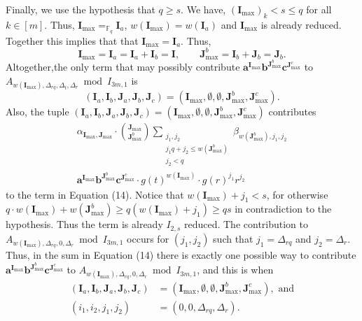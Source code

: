 Finally, we use the hypothesis that $q\geq s$. We have, $(\boldsymbol I_{\max})_k<s\leq q$ for all $k\in[m]$. Thus, $\boldsymbol I_{\max}=_{\mathbb F_q}\boldsymbol I_a$, $w(\boldsymbol I_{\max})=w(\boldsymbol I_a)$ and $\boldsymbol I_{\max}$ is already reduced. Together this implies that that $\boldsymbol I_{\max}=\boldsymbol I_a$.
Thus,
\[\boldsymbol I_{\max}=\boldsymbol I_a=\boldsymbol I_a+\boldsymbol I_b=\boldsymbol I,\qquad\boldsymbol J_{\max}^b=\boldsymbol I_b+\boldsymbol J_b=\boldsymbol J_b.\]
Altogether,the only term that may possibly contribute $\boldsymbol a^{\boldsymbol I_{\max}}\boldsymbol b^{\boldsymbol J_{\max}^b}\boldsymbol c^{\boldsymbol J_{\max}^c}$ to $A_{w(\boldsymbol I_{\max}),\Delta_{rq},\Delta_t,\Delta_r}\bmod I_{3m,1}$ is
\[(\boldsymbol I_a,\boldsymbol I_b,\boldsymbol J_a,\boldsymbol J_b,\boldsymbol J_c)=(\boldsymbol I_{\max},\emptyset,\emptyset,\boldsymbol J_{\max}^b,\boldsymbol J_{\max}^c).\]
Also, the tuple $(\boldsymbol I_a,\boldsymbol I_b,\boldsymbol J_a,\boldsymbol J_b,\boldsymbol J_c)=(\boldsymbol I_{\max},\emptyset,\emptyset,\boldsymbol J_{\max}^b,\boldsymbol J_{\max}^c)$ contributes
\begin{multline*}
\alpha_{\boldsymbol I_{\max},\boldsymbol J_{\max}}\cdot\binom{\boldsymbol J_{\max}}{\boldsymbol J_{\max}^b}\sum_{\substack{j_1,j_2\\j_1q+j_2\leq w(\boldsymbol J_{\max}^b)\\j_2<q}}\beta_{w(\boldsymbol J_{\max}^b),j_1,j_2}\\
\boldsymbol a^{\boldsymbol I_{\max}}\boldsymbol b^{\boldsymbol J_{\max}^b}\boldsymbol c^{\boldsymbol J_{\max}^c}\cdot g(t)^{w(\boldsymbol I_{\max})}\cdot g(r)^{j_1}r^{j_2}
\end{multline*}
to the term in Equation (14).
Notice that $w(\boldsymbol I_{\max})+j_1<s$, for otherwise $q\cdot w(\boldsymbol I_{\max})+w(\boldsymbol J_{\max}^b)\geq q(w(\boldsymbol I_{\max})+j_1)\geq qs$ in contradiction to the hypothesis. Thus the term is already $I_{2,s}$ reduced. The contribution to $A_{w(\boldsymbol I_{\max}),\Delta_{rq},0,\Delta_r}\bmod I_{3m,1}$ occurs for $(j_1,j_2)$ such that $j_1=\Delta_{rq}$ and $j_2=\Delta_r$. Thus, in the sum in Equation (14) there is exactly one possible way to contribute $\boldsymbol a^{\boldsymbol I_{\max}}\boldsymbol b^{\boldsymbol J_{\max}^b}\boldsymbol c^{\boldsymbol J_{\max}^c}$ to $A_{w(\boldsymbol I_{\max}),\Delta_{rq},0,\Delta_r}\bmod I_{3m,1}$, and this is when
\begin{align*}
(\boldsymbol I_a,\boldsymbol I_b,\boldsymbol J_a,\boldsymbol J_b,\boldsymbol J_c)&=(\boldsymbol I_{\max},\emptyset,\emptyset,\boldsymbol J_{\max}^b,\boldsymbol J_{\max}^c),\text{ and}\\
(i_1,i_2,j_1,j_2)&=(0,0,\Delta_{rq},\Delta_r).
\end{align*}
